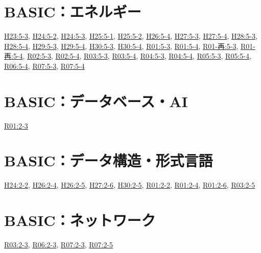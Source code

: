 \section{BASIC：エネルギー}
\hyperref[q:h23-reg-basic-5-3]{H23:5-3}, \hyperref[q:h24-reg-basic-5-2]{H24:5-2}, \hyperref[q:h24-reg-basic-5-3]{H24:5-3}, \hyperref[q:h25-reg-basic-5-1]{H25:5-1}, \hyperref[q:h25-reg-basic-5-2]{H25:5-2}, \hyperref[q:h26-reg-basic-5-4]{H26:5-4}, \hyperref[q:h27-reg-basic-5-3]{H27:5-3}, \hyperref[q:h27-reg-basic-5-4]{H27:5-4}, \hyperref[q:h28-reg-basic-5-3]{H28:5-3}, \hyperref[q:h28-reg-basic-5-4]{H28:5-4}, \hyperref[q:h29-reg-basic-5-3]{H29:5-3}, \hyperref[q:h29-reg-basic-5-4]{H29:5-4}, \hyperref[q:h30-reg-basic-5-3]{H30:5-3}, \hyperref[q:h30-reg-basic-5-4]{H30:5-4}, \hyperref[q:r01-reg-basic-5-3]{R01:5-3}, \hyperref[q:r01-reg-basic-5-4]{R01:5-4}, \hyperref[q:r01-ret-basic-5-3]{R01-再:5-3}, \hyperref[q:r01-ret-basic-5-4]{R01-再:5-4}, \hyperref[q:r02-reg-basic-5-3]{R02:5-3}, \hyperref[q:r02-reg-basic-5-4]{R02:5-4}, \hyperref[q:r03-reg-basic-5-3]{R03:5-3}, \hyperref[q:r03-reg-basic-5-4]{R03:5-4}, \hyperref[q:r04-reg-basic-5-3]{R04:5-3}, \hyperref[q:r04-reg-basic-5-4]{R04:5-4}, \hyperref[q:r05-reg-basic-5-3]{R05:5-3}, \hyperref[q:r05-reg-basic-5-4]{R05:5-4}, \hyperref[q:r06-reg-basic-5-4]{R06:5-4}, \hyperref[q:r07-reg-basic-5-3]{R07:5-3}, \hyperref[q:r07-reg-basic-5-4]{R07:5-4}
\section{BASIC：データベース・AI}
\hyperref[q:r01-reg-basic-2-3]{R01:2-3}
\section{BASIC：データ構造・形式言語}
\hyperref[q:h24-reg-basic-2-2]{H24:2-2}, \hyperref[q:h26-reg-basic-2-4]{H26:2-4}, \hyperref[q:h26-reg-basic-2-5]{H26:2-5}, \hyperref[q:h27-reg-basic-2-6]{H27:2-6}, \hyperref[q:h30-reg-basic-2-5]{H30:2-5}, \hyperref[q:r01-reg-basic-2-2]{R01:2-2}, \hyperref[q:r01-reg-basic-2-4]{R01:2-4}, \hyperref[q:r01-reg-basic-2-6]{R01:2-6}, \hyperref[q:r03-reg-basic-2-5]{R03:2-5}
\section{BASIC：ネットワーク}
\hyperref[q:r03-reg-basic-2-3]{R03:2-3}, \hyperref[q:r06-reg-basic-2-3]{R06:2-3}, \hyperref[q:r07-reg-basic-2-3]{R07:2-3}, \hyperref[q:r07-reg-basic-2-5]{R07:2-5}
